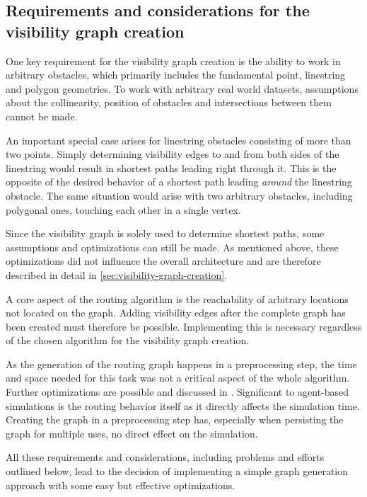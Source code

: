 	\subsection{Requirements and considerations for the visibility graph creation}
	
		One key requirement for the visibility graph creation is the ability to work in arbitrary obstacles, which primarily includes the fundamental point, linestring and polygon geometries.
		To work with arbitrary real world datasets, assumptions about the collinearity, position of obstacles and intersections between them cannot be made.
		
		An important special case arises for linestring obstacles consisting of more than two points.
		Simply determining visibility edges to and from both sides of the linestring would result in shortest paths leading right through it.
		This is the opposite of the desired behavior of a shortest path leading \emph{around} the linestring obstacle.
		The same situation would arise with two arbitrary obstacles, including polygonal ones, touching each other in a single vertex.
		
		Since the visibility graph is solely used to determine shortest paths, some assumptions and optimizations can still be made.
		As mentioned above, these optimizations did not influence the overall architecture and are therefore described in detail in \cref{sec:visibility-graph-creation}.
		
		A core aspect of the routing algorithm is the reachability of arbitrary locations not located on the graph.
		Adding visibility edges after the complete graph has been created must therefore be possible.
		Implementing this is necessary regardless of the chosen algorithm for the visibility graph creation.
		
		As the generation of the routing graph happens in a preprocessing step, the time and space needed for this task was not a critical aspect of the whole algorithm.
		Further optimizations are possible and discussed in .
		Significant to agent-based simulations is the routing behavior itself as it directly affects the simulation time.
		Creating the graph in a preprocessing step has, especially when persisting the graph for multiple uses, no direct effect on the simulation.
		
		All these requirements and considerations, including problems and efforts outlined below, lead to the decision of implementing a simple graph generation approach with some easy but effective optimizations.
	
